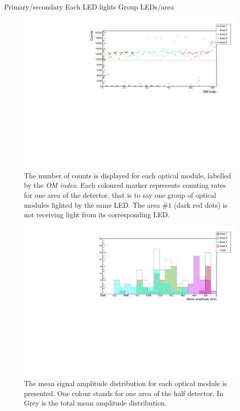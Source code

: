 Primary/secondary
Each LED lights
Group LEDs/area

\begin{figure}[h]
  \centering
  \includegraphics[width=15cm]{commissioning/fig_commissioning/LI_1d_counts.pdf}
  \caption{The number of counts is displayed for each optical module, labelled by the \emph{OM index}.
    Each coloured marker represents counting rates for one area of the detector, that is to say one group of optical modules lighted by the same LED.
    The area \#$1$ (dark red dots) is not receiving light from its corresponding LED.
    \label{fig:LI_counts}}
\end{figure}


\begin{figure}[h]
  \centering
  \includegraphics[width=15cm]{commissioning/fig_commissioning/LI_mean_ampl.pdf}
  \caption{The mean signal amplitude distribution for each optical module is presented.
    One colour stands for one area of the half detector.
    In Grey is the total mean amplitude distribution.
    \label{fig:LI_ampl}}
\end{figure}



